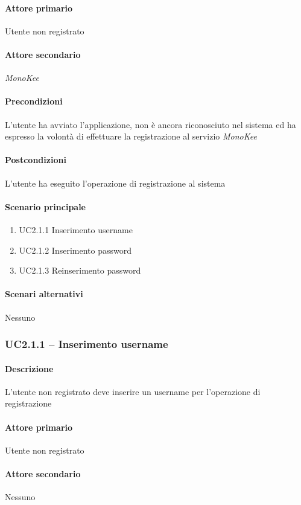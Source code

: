 \paragraph{Attore primario}  Utente non registrato
\paragraph{Attore secondario}  \textit{MonoKee}
\paragraph{Precondizioni}  L’utente ha avviato l’applicazione, non è ancora riconosciuto nel sistema ed ha espresso la volontà di effettuare la registrazione al servizio \textit{MonoKee}
\paragraph{Postcondizioni}  L’utente ha eseguito l’operazione di registrazione al sistema
\paragraph{Scenario principale}  
    \begin{enumerate}
        \item UC2.1.1 Inserimento username
        \item UC2.1.2 Inserimento password
        \item UC2.1.3 Reinserimento password
    \end{enumerate}
\paragraph{Scenari alternativi}  Nessuno



\subsubsection{UC2.1.1 – Inserimento username}
\paragraph{Descrizione}  L’utente non registrato deve inserire un username per l’operazione di registrazione
\paragraph{Attore primario}  Utente non registrato
\paragraph{Attore secondario}  Nessuno
